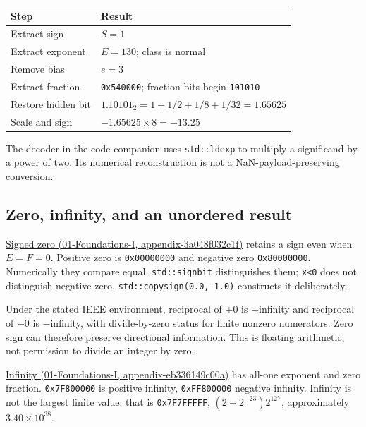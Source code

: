 {\def\LTcaptype{none} %
\begin{longtable}[]{@{}ll@{}}
\toprule\noalign{}
Step & Result \\
\midrule\noalign{}
\endhead
\bottomrule\noalign{}
\endlastfoot
Extract sign & \(S=1\) \\
Extract exponent & \(E=130\); class is normal \\
Remove bias & \(e=3\) \\
Extract fraction & \texttt{0x540000}; fraction bits begin \texttt{101010} \\
Restore hidden bit & \(1.10101_2=1+1/2+1/8+1/32=1.65625\) \\
Scale and sign & \(-1.65625\times8=-13.25\) \\
\end{longtable}
}

The decoder in the code companion uses \texttt{std::ldexp} to multiply a significand by a power of two. Its numerical reconstruction is not a NaN-payload-preserving conversion.

\subsection{Zero, infinity, and an unordered result}\label{05-engine-i-ch001-zero-infinity-and-an-unordered-result}

\href{../01-Foundations-I/main.pdf\#nameddest=appendix-3a048f032c1f}{Signed zero (01-Foundations-I, appendix-3a048f032c1f)} retains a sign even when \(E=F=0\). Positive zero is \texttt{0x00000000} and negative zero \texttt{0x80000000}. Numerically they compare equal. \texttt{std::signbit} distinguishes them; \texttt{x\textless{}0} does not distinguish negative zero. \texttt{std::copysign(0.0,-1.0)} constructs it deliberately.

Under the stated IEEE environment, reciprocal of +0 is +infinity and reciprocal of −0 is −infinity, with divide-by-zero status for finite nonzero numerators. Zero sign can therefore preserve directional information. This is floating arithmetic, not permission to divide an integer by zero.

\href{../01-Foundations-I/main.pdf\#nameddest=appendix-eb336149c00a}{Infinity (01-Foundations-I, appendix-eb336149c00a)} has all-one exponent and zero fraction. \texttt{0x7F800000} is positive infinity, \texttt{0xFF800000} negative infinity. Infinity is not the largest finite value: that is \texttt{0x7F7FFFFF}, \((2-2^{-23})2^{127}\), approximately \(3.40\times10^{38}\).

